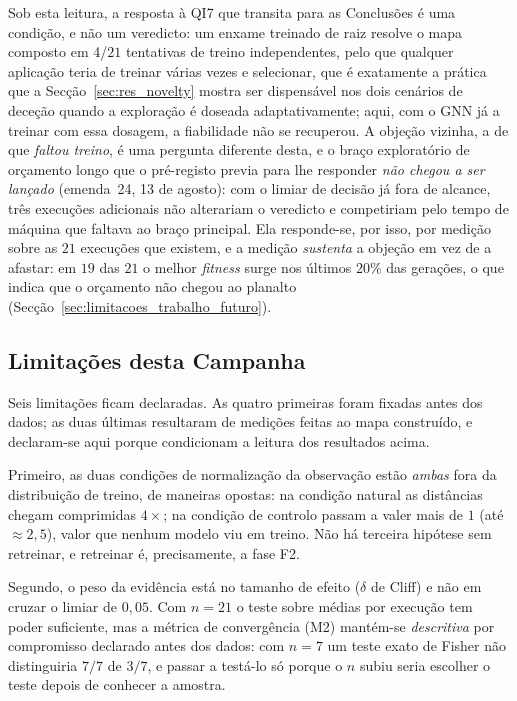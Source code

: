 Sob esta leitura, a resposta à QI7 que transita para as Conclusões é uma
condição, e não um veredicto: um enxame treinado de raiz resolve o mapa composto em
4/$21$ tentativas de treino independentes, pelo que qualquer
aplicação teria de treinar várias vezes e selecionar, que é exatamente a
prática que a Secção~\ref{sec:res_novelty} mostra ser dispensável nos dois
cenários de deceção quando a exploração é doseada adaptativamente; aqui, com
o GNN já a treinar com essa dosagem, a fiabilidade não se recuperou.
A objeção vizinha, a de que \emph{faltou treino}, é uma
pergunta diferente desta, e o braço exploratório de orçamento longo que o
pré-registo previa para lhe responder \emph{não chegou a ser lançado}
(emenda~24, 13 de agosto): com o limiar de decisão já fora de alcance, três
execuções adicionais não alterariam o veredicto e competiriam pelo tempo de
máquina que faltava ao braço principal. Ela responde-se, por isso, por medição
sobre as $21$ execuções que existem, e a medição \emph{sustenta} a objeção em
vez de a afastar: em $19$ das $21$ o melhor \textit{fitness} surge nos últimos
$20\%$ das gerações, o que indica que o orçamento não chegou ao planalto
(Secção~\ref{sec:limitacoes_trabalho_futuro}).

\subsection{Limitações desta Campanha}

Seis limitações ficam declaradas. As quatro primeiras foram fixadas antes dos
dados; as duas últimas resultaram de medições feitas ao mapa construído, e
declaram-se aqui porque condicionam a leitura dos resultados acima.

Primeiro, as duas condições de normalização da observação estão \emph{ambas}
fora da distribuição de treino, de maneiras opostas: na condição natural as
distâncias chegam comprimidas $4\times$; na condição de controlo passam a valer
mais de $1$ (até $\approx 2{,}5$), valor que nenhum modelo viu em treino. Não há
terceira hipótese sem retreinar, e retreinar é, precisamente, a fase F2.

Segundo, o peso da evidência está no tamanho de efeito ($\delta$ de Cliff) e não
em cruzar o limiar de $0{,}05$. Com $n = 21$ o teste sobre médias por execução
tem poder suficiente, mas a métrica de convergência (M2) mantém-se
\emph{descritiva} por compromisso declarado antes dos dados: com $n=7$ um teste
exato de Fisher não distinguiria $7/7$ de $3/7$, e passar a testá-lo só porque o
$n$ subiu seria escolher o teste depois de conhecer a amostra.

